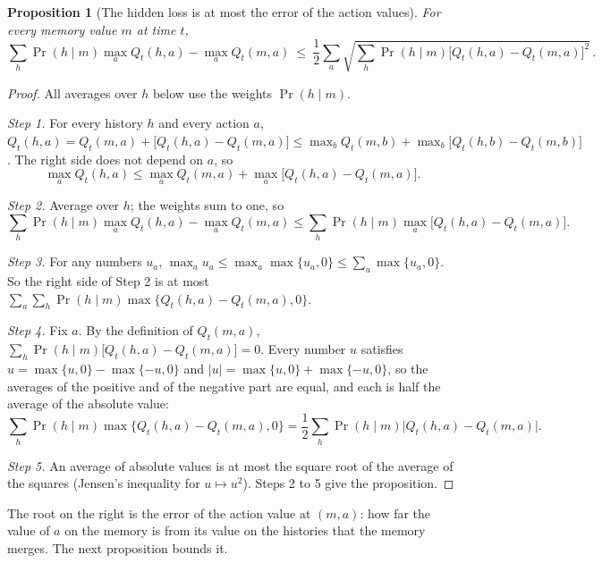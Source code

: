\documentclass[11pt]{article}
\newtheorem{proposition}{Proposition}
\theoremstyle{definition}
\begin{document}
\begin{proposition}[The hidden loss is at most the error of the action values]\label{prop:terms}
For every memory value $m$ at time $t$,
\[
\sum_h\Pr(h\mid m)\max_aQ_t(h,a)-\max_aQ_t(m,a)\ \le\ \frac12\sum_a\sqrt{\sum_h\Pr(h\mid m)\big[Q_t(h,a)-Q_t(m,a)\big]^2}\,.
\]
\end{proposition}
\begin{proof}
All averages over $h$ below use the weights $\Pr(h\mid m)$.

\emph{Step 1.} For every history $h$ and every action $a$, $Q_t(h,a)=Q_t(m,a)+\big[Q_t(h,a)-Q_t(m,a)\big]\le\max_bQ_t(m,b)+\max_b\big[Q_t(h,b)-Q_t(m,b)\big]$. The right side does not depend on $a$, so
\[
\max_aQ_t(h,a)\le\max_aQ_t(m,a)+\max_a\big[Q_t(h,a)-Q_t(m,a)\big].
\]

\emph{Step 2.} Average over $h$; the weights sum to one, so
\[
\sum_h\Pr(h\mid m)\max_aQ_t(h,a)-\max_aQ_t(m,a)\le\sum_h\Pr(h\mid m)\max_a\big[Q_t(h,a)-Q_t(m,a)\big].
\]

\emph{Step 3.} For any numbers $u_a$, $\max_au_a\le\max_a\max\{u_a,0\}\le\sum_a\max\{u_a,0\}$. So the right side of Step 2 is at most $\sum_a\sum_h\Pr(h\mid m)\max\big\{Q_t(h,a)-Q_t(m,a),0\big\}$.

\emph{Step 4.} Fix $a$. By the definition of $Q_t(m,a)$, $\sum_h\Pr(h\mid m)\big[Q_t(h,a)-Q_t(m,a)\big]=0$. Every number $u$ satisfies $u=\max\{u,0\}-\max\{-u,0\}$ and $|u|=\max\{u,0\}+\max\{-u,0\}$, so the averages of the positive and of the negative part are equal, and each is half the average of the absolute value:
\[
\sum_h\Pr(h\mid m)\max\big\{Q_t(h,a)-Q_t(m,a),0\big\}=\frac12\sum_h\Pr(h\mid m)\big|Q_t(h,a)-Q_t(m,a)\big|.
\]

\emph{Step 5.} An average of absolute values is at most the square root of the average of the squares (Jensen's inequality for $u\mapsto u^2$). Steps 2 to 5 give the proposition.
\end{proof}

The root on the right is the error of the action value at $(m,a)$: how far the value of $a$ on the memory is from its value on the histories that the memory merges. The next proposition bounds it.
\end{document}
